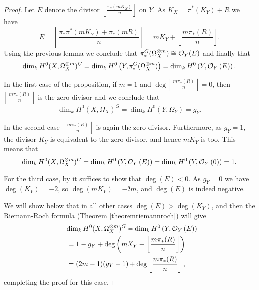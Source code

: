     \begin{proof}
    Let $E$ denote the divisor $\left\lfloor \frac{\pi_*(mK_X)}{n} \right\rfloor$ on $Y$. As $K_X=\pi^*(K_Y)+R$ we have
        \[ 
        E = 
        \left \lfloor \frac{\pi_*\pi^*(mK_Y) + \pi_*(mR)}{n} \right \rfloor =
        mK_Y + \left \lfloor \frac{m\pi_*(R)}{n} \right \rfloor.
        \]
    Using the previous lemma we conclude that $\pi_*^G(\Omega_X^{\otimes m}) \cong {\cal O}_Y (E)$ and finally that
        \begin{equation*}
        \dim_k H^0(X,\Omega_X^{\otimes m})^G 
        = \dim_k H^0\left(Y, \pi_*^G(\Omega_X^{\otimes m})\right)
        = \dim_k H^0\left(Y, {\cal O}_Y\left( E \right) \right).
        \end{equation*}
    
    
    In the first case of the proposition, \ie if $m=1$ and $\deg \left\lfloor\frac{m\pi_*(R)}{n} \right\rfloor=0$, then $\left\lfloor\frac{m\pi_*(R)}{n} \right\rfloor$ is the zero divisor and we conclude that 
        \begin{equation*}
        \dim_kH^0(X,\Omega_X)^G = \dim_kH^0(Y, \Omega_Y) = g_Y.
        \end{equation*}
    
    
    In the second case $\left\lfloor \frac{m\pi_*(R)}{n} \right\rfloor$ is again the zero divisor. 
    Furthermore, as $g_Y=1$, the divisor $K_Y$ is equivalent to the zero divisor, and hence $mK_Y$ is too. 
    This means that
        \begin{equation*}
        \dim_kH^0(X,\Omega_X^{\otimes m})^G = \dim_kH^0\left( Y,{\cal O}_Y\left( E \right) \right) 
        = \dim_k  H^0\left( Y,{\cal O}_Y\left( 0 \right) \right)
        = 1.
        \end{equation*}
    
    
    For the third case, by \cite[Chap. IV, ex. 1.3.4]{hart} it suffices to show that $\deg \left( E \right) < 0$.
    As $g_Y=0$ we have $\deg(K_Y)=-2$, so $\deg(mK_Y)=-2m$, and $\deg \left( E \right)$ is indeed negative.
    
    
    
    We will show below that in all other cases $\deg(E) > \deg(K_Y)$, and then the Riemann-Roch formula (Theorem \ref{theoremriemannroch}) will give 
        \begin{align*}
        \lefteqn{\dim_kH^0(X,\Omega_X^{\otimes m})^G = \dim_kH^0\left(Y,\cO_Y\left( E \right)\right)} \\
        & =  1-g_Y+\deg\left(mK_Y+\left\lfloor{\frac{m\pi_*(R)}{n}}\right\rfloor\right) \\
        & =  (2m-1)(g_Y-1)+\deg\left\lfloor{\frac{m\pi_*(R)}{n}}\right\rfloor,
        \end{align*}
    completing the proof for this case.
    

\end{proof}
